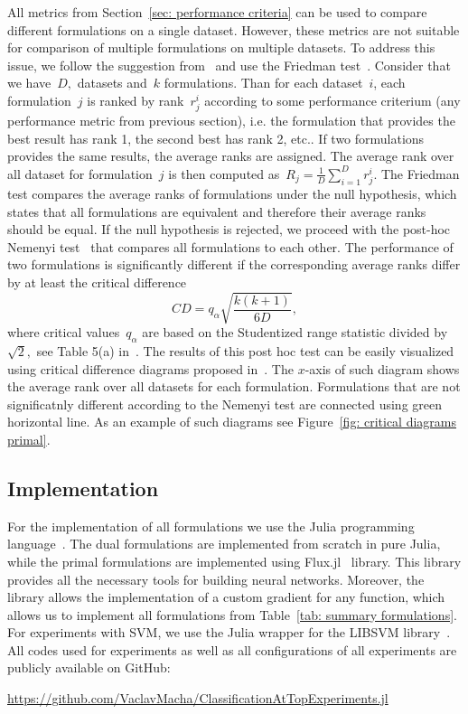 All metrics from Section~\ref{sec: performance criteria} can be used to compare different formulations on a single dataset. However, these metrics are not suitable for comparison of multiple formulations on multiple datasets. To address this issue, we follow the suggestion from~\cite{demvsar2006statistical} and use the Friedman test~\cite{friedman1940comparison}. Consider that we have~$D,$ datasets and~$k$ formulations. Than for each dataset~$i$, each formulation~$j$ is ranked by rank~$r^i_j$ according to some performance criterium (any performance metric from previous section), i.e. the formulation that provides the best result has rank 1, the second best has rank 2, etc.. If two formulations provides the same results, the average ranks are assigned. The average rank over all dataset for formulation~$j$ is then computed as~$R_j = \frac{1}{D} \sum_{i = 1}^{D} r^{i}_{j}.$ The Friedman test compares the average ranks of formulations under the null hypothesis, which states that all formulations are equivalent and therefore their average ranks should be equal. If the null hypothesis is rejected, we proceed with the post-hoc Nemenyi test~\cite{nemenyi1963distribution} that compares all formulations to each other. The performance of two formulations is significantly different if the corresponding average
ranks differ by at least the critical difference
\begin{equation*}
  CD = q_{\alpha} \sqrt{\frac{k(k + 1)}{6D}},
\end{equation*}
where critical values~$q_{\alpha}$ are based on the Studentized range statistic divided by~$\sqrt{2},$ see Table 5(a) in~\cite{demvsar2006statistical}. The results of this post hoc test can be easily visualized using critical difference diagrams proposed in~\cite{demvsar2006statistical}.  The $x$-axis of such diagram shows the average rank over all datasets for each formulation. Formulations that are not significatnly different according to the Nemenyi test are connected using green horizontal line. As an example of such diagrams see Figure~\ref{fig: critical diagrams primal}.

\subsection{Implementation}

For the implementation of all formulations we use the Julia programming language~\cite{bezanson2017julia}. The dual formulations are implemented from scratch in pure Julia, while the primal formulations are implemented using Flux.jl~\cite{innes:2018, Flux.jl-2018} library. This library provides all the necessary tools for building neural networks. Moreover, the library allows the implementation of a custom gradient for any function, which allows us to implement all formulations from Table~\ref{tab: summary formulations}. For experiments with SVM, we use the Julia wrapper for the LIBSVM library~\cite{chang2011libsvm}. All codes used for experiments as well as all configurations of all experiments are publicly available on GitHub:
\begin{center}
  \url{https://github.com/VaclavMacha/ClassificationAtTopExperiments.jl}
\end{center}

